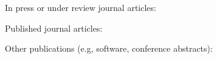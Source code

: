 \ifdefined\withunpublished{}
In press or under review journal articles:
\begin{etaremune}

\end{etaremune}
Published journal articles:
\else\fi
\begin{etaremune}

\end{etaremune}
\ifdefined\withnonpapers{}
Other publications (e.g, software, conference abstracts):
\begin{etaremune}

\end{etaremune}
\else\fi